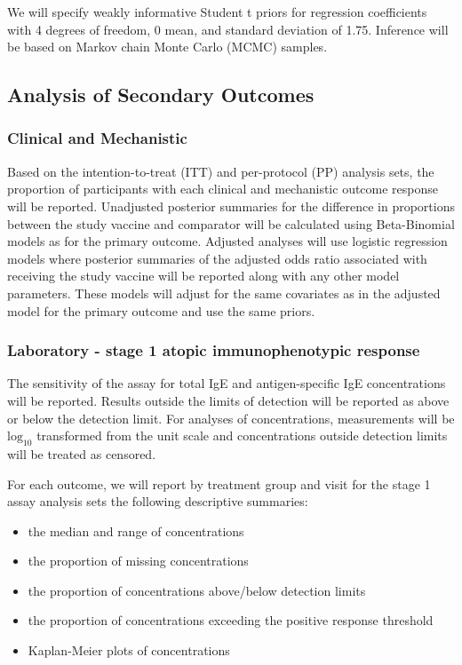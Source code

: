 \documentclass{bmcart}
\begin{document}
We will specify weakly informative Student t priors for regression coefficients with 4 degrees of freedom, 0 mean, and standard deviation of 1.75.
Inference will be based on Markov chain Monte Carlo (MCMC) samples.


\subsection*{Analysis of Secondary Outcomes}

\subsubsection*{Clinical and Mechanistic}

Based on the intention-to-treat (ITT) and per-protocol (PP) analysis sets, the proportion of participants with each clinical and mechanistic outcome response will be reported.
Unadjusted posterior summaries for the difference in proportions between the study vaccine and comparator will be calculated using Beta-Binomial models as for the primary outcome.
Adjusted analyses will use logistic regression models where posterior summaries of the adjusted odds ratio associated with receiving the study vaccine will be reported along with any other model parameters.
These models will adjust for the same covariates as in the adjusted model for the primary outcome and use the same priors.

\subsubsection*{Laboratory - stage 1 atopic immunophenotypic response}

The sensitivity of the assay for total IgE and antigen-specific IgE concentrations will be reported. Results outside the limits of detection will be reported as above or below the detection limit. For analyses of concentrations, measurements will be $\text{log}_{10}$ transformed from the unit scale and concentrations outside detection limits will be treated as censored.

For each outcome, we will report by treatment group and visit for the stage 1 assay analysis sets the following descriptive summaries:
\begin{itemize}
	\item the median and range of concentrations
	\item the proportion of missing concentrations
	\item the proportion of concentrations above/below detection limits
	\item the proportion of concentrations exceeding the positive response threshold
	\item Kaplan-Meier plots of concentrations
\end{itemize}
\end{document}
